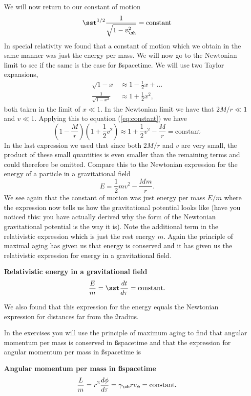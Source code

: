 {\begin{multicols}{2}
We will now return to our constant of motion
\begin{equation}
\label{eq:constant}
\sst^{1/2}\frac{1}{\sqrt{1-v_\sh^2}}=\mathrm{constant}
\end{equation}
In special relativity we found that a constant of motion which we obtain in the same manner was just the energy per mass. We will now go to the Newtonian limit to see if the same is the case for \ss spacetime. We will use two Taylor expansions,
\begin{align*}
\sqrt{1-x}&\approx 1-\frac{1}{2}x+...\\
\frac{1}{\sqrt{1-x^2}}&\approx 1+\frac{1}{2}x^2,
\end{align*}
both taken in the limit of $x\ll1$. In the Newtonian limit we have that $2M/r\ll1$ and $v\ll1$. Applying this to equation (\ref{eq:constant}) we have
\[
\left(1-\frac{M}{r}\right)\left(1+\frac{1}{2}v^2\right)\approx 1+\frac{1}{2}v^2-\frac{M}{r}=\mathrm{constant}
\]
In the last expression we used that since both $2M/r$ and $v$ are very small, the product of these small quantities is even smaller than the remaining terms and could therefore be omitted. Compare this to the Newtonian expression for the energy of a particle in a gravitational field
\[
E=\frac{1}{2}mv^2-\frac{Mm}{r}.
\]
We see again that the constant of motion was just energy per mass $E/m$ where the expression now tells us how the gravitational potential looks like (have you noticed this: you have actually derived why the form of the Newtonian gravitational potential is the way it is). Note the additional term in the relativistic expression which is just the rest energy $m$. Again the principle of maximal aging has given us that energy is conserved and it has given us the relativistic expression for energy in a gravitational field.
\begin{formbox}
\textbf{Relativistic energy in a gravitational field}
\[
\frac{E}{m}=\sst\frac{dt}{d\tau} = {\rm constant}.
\]
\end{formbox}
We also found that this expression for the energy equals the Newtonian expression for distances far from the \ss radius.

In the exercises you will use the principle of maximum aging to find that angular momentum per mass is conserved in \ss spacetime and that the expression for angular momentum per mass in \ss spacetime is
\begin{formbox}
\textbf{Angular momentum per mass in \ss spacetime}
\[
\frac{L}{m}=r^2\frac{d\phi}{d\tau}=\gamma_\sh r v_\phi=\mathrm{constant}.
\]
\end{formbox}






\end{multicols}}
